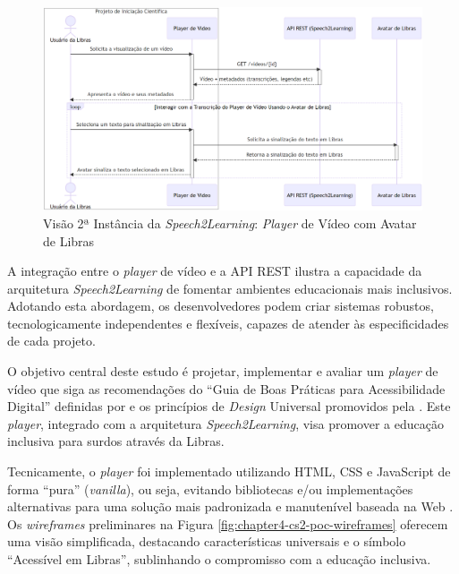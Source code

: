 \begin{figure}[htbp]
\centering
\caption{Visão 2ª Instância da \textit{Speech2Learning}: \textit{Player} de Vídeo com Avatar de Libras}
\label{fig:chapter4-cs2-poc-diagram}
\includegraphics[width=1\textwidth]{images/chapter4-cs2-poc-diagram.png}
\fautor
\end{figure}

A integração entre o \textit{player} de vídeo e a API REST ilustra a capacidade da arquitetura \textit{Speech2Learning} de fomentar ambientes educacionais mais inclusivos. Adotando esta abordagem, os desenvolvedores podem criar sistemas robustos, tecnologicamente independentes e flexíveis, capazes de atender às especificidades de cada projeto.

O objetivo central deste estudo é projetar, implementar e avaliar um \textit{player} de vídeo que siga as recomendações do ``Guia de Boas Práticas para Acessibilidade Digital'' definidas por  e os princípios de \textit{Design} Universal promovidos pela . Este \textit{player}, integrado com a arquitetura \textit{Speech2Learning}, visa promover a educação inclusiva para surdos através da Libras.

Tecnicamente, o \textit{player} foi implementado utilizando HTML, CSS e JavaScript de forma ``pura'' (\textit{vanilla}), ou seja, evitando bibliotecas e/ou implementações alternativas para uma solução mais padronizada e manutenível baseada na Web \cite{GovBr2023}. Os \textit{wireframes} preliminares na Figura \ref{fig:chapter4-cs2-poc-wireframes} oferecem uma visão simplificada, destacando características universais e o símbolo ``Acessível em Libras'', sublinhando o compromisso com a educação inclusiva.

